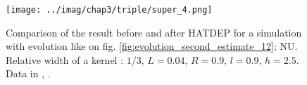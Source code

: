\begin{figure}
\centering
\texttt{[image: ../imag/chap3/triple/super\_4.png]}
\caption{Comparison of the result before and after HATDEP for a simulation with evolution like on fig. \ref{fig:evolution_second_estimate_12}; NU. Relative width of a kernel : $1/3$, $L = 0.04$, $R = 0.9$, $l = 0.9$, $h = 2.5$. Data in \protect {}, \protect {}.}
\label{fig:second_estimate_12_nu}
\end{figure}



